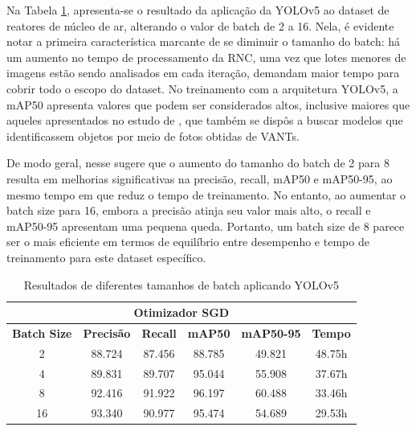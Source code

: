 Na Tabela \ref{tab:yolov5-teste}, apresenta-se o resultado da aplicação da YOLOv5 ao dataset de reatores de núcleo de ar, alterando o valor de batch de 2 a 16. Nela, é evidente notar a primeira característica marcante de se diminuir o tamanho do batch: há um aumento no tempo de processamento da RNC, uma vez que lotes menores de imagens estão sendo analisados em cada iteração, demandam maior tempo para cobrir todo o escopo do dataset. No treinamento com a arquitetura YOLOv5, a mAP50 apresenta valores que podem ser considerados altos, inclusive maiores que aqueles apresentados no estudo de \cite{wang2023uav}, que também se dispôs a buscar modelos que identificassem objetos por meio de fotos obtidas de VANTs.

De modo geral, nesse sugere que o aumento do tamanho do batch de 2 para 8 resulta em melhorias significativas na precisão, recall, mAP50 e mAP50-95, ao mesmo tempo em que reduz o tempo de treinamento. No entanto, ao aumentar o batch size para 16, embora a precisão atinja seu valor mais alto, o recall e mAP50-95 apresentam uma pequena queda. Portanto, um batch size de 8 parece ser o mais eficiente em termos de equilíbrio entre desempenho e tempo de treinamento para este dataset específico.

\begin{table}[!hbt]
    \centering
    \begin{tabular}{|c|c|c|c|c|c|}
    \hline
    \multicolumn{6}{|c|}{\textbf{Otimizador SGD}} \\ \hline
    \textbf{Batch Size} & \textbf{Precisão} & \textbf{Recall} & \textbf{mAP50} & \textbf{mAP50-95} & \textbf{Tempo} \\ \hline
    2                   & 88.724                & 87.456               & 88.785              & 49.821                 & 48.75h             \\ \hline
    4                   & 89.831                 & 89.707               & 95.044             & 55.908                & 37.67h             \\ \hline
    8                   & 92.416                 & 91.922               & 96.197              & 60.488                 & 33.46h             \\ \hline
    16                  & 93.340                 & 90.977               & 95.474              & 54.689                 & 29.53h             \\ \hline
    \end{tabular}
    \caption{Resultados de diferentes tamanhos de batch aplicando YOLOv5}
    \label{tab:yolov5-teste}
\end{table}

